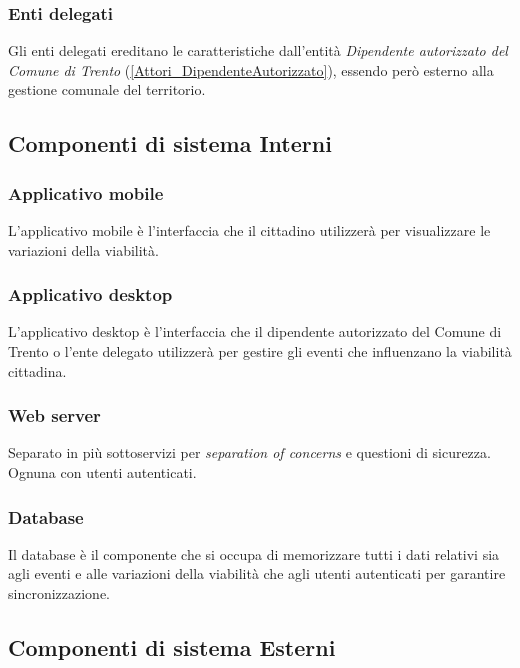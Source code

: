 \documentclass{article}
\begin{document}
\subsubsection{Enti delegati}
\label{3.2.1}
Gli enti delegati ereditano le caratteristiche dall'entità \textit{Dipendente autorizzato del Comune di Trento} (\ref{Attori_DipendenteAutorizzato}), essendo però esterno alla gestione comunale del territorio.

\subsection{Componenti di sistema Interni}

\subsubsection{Applicativo mobile}
\label{3.3.1}
L'applicativo mobile è l'interfaccia che il cittadino utilizzerà per visualizzare le variazioni della viabilità.

\subsubsection{Applicativo desktop}
\label{3.3.2}
L'applicativo desktop è l'interfaccia che il dipendente autorizzato del Comune di Trento o l'ente delegato utilizzerà per gestire gli eventi che influenzano la viabilità cittadina.

\subsubsection{Web server}
\label{3.3.3}
Separato in più sottoservizi per \textit{separation of concerns} e questioni di sicurezza.
Ognuna con utenti autenticati.

\subsubsection{Database}
\label{3.3.4}
Il database è il componente che si occupa di memorizzare tutti i dati relativi sia agli eventi e alle variazioni della viabilità che agli utenti autenticati per garantire sincronizzazione.

\subsection{Componenti di sistema Esterni}
\end{document}

